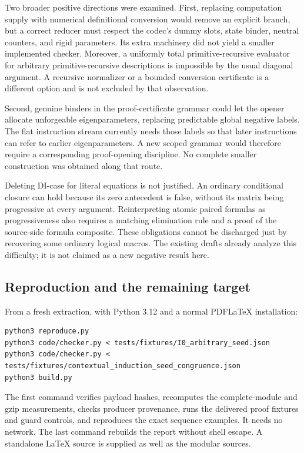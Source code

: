 Two broader positive directions were examined. First, replacing
computation supply with numerical definitional conversion would remove
an explicit branch, but a correct reducer must respect the codec's
dummy slots, state binder, neutral counters, and rigid parameters. Its
extra machinery did not yield a smaller implemented checker. Moreover,
a uniformly total primitive-recursive evaluator for arbitrary
primitive-recursive descriptions is impossible by the usual diagonal
argument. A recursive normalizer or a bounded conversion certificate
is a different option and is not excluded by that observation.

Second, genuine binders in the proof-certificate grammar could let the
opener allocate unforgeable eigenparameters, replacing predictable
global negative labels. The flat instruction stream currently needs
those labels so that later instructions can refer to earlier
eigenparameters. A new scoped grammar would therefore require a
corresponding proof-opening discipline. No complete smaller construction
was obtained along that route.

Deleting DI-case for literal equations is not justified. An ordinary
conditional closure can hold because its zero antecedent is false,
without its matrix being progressive at every argument. Reinterpreting
atomic paired formulas as progressiveness also requires a matching
elimination rule and a proof of the source-side formula composite.
These obligations cannot be discharged just by recovering some ordinary
logical macros. The existing drafts already analyze this difficulty;
it is not claimed as a new negative result here.

\subsection{Reproduction and the remaining target}

From a fresh extraction, with Python 3.12 and a normal PDFLaTeX
installation:
\begin{lstlisting}
python3 reproduce.py
python3 code/checker.py < tests/fixtures/I0_arbitrary_seed.json
python3 code/checker.py < tests/fixtures/contextual_induction_seed_congruence.json
python3 build.py
\end{lstlisting}
The first command verifies payload hashes, recomputes the complete-module
and gzip measurements, checks producer provenance, runs the delivered
proof fixtures and guard controls, and reproduces the exact sequence
examples. It needs no network. The last command rebuilds the report
without shell escape. A standalone LaTeX source is supplied as well as
the modular sources.

